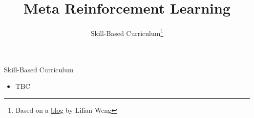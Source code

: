 


\title[Meta-RL]{Meta Reinforcement Learning}
\subtitle{Skill-Based Curriculum\footnote{Based on a \href{https://lilianweng.github.io/lil-log/2020/01/29/curriculum-for-reinforcement-learning.html}{blog} by Lilian Weng}}



	
	\maketitle

\begin{frame}[c]{Skill-Based Curriculum}
	
	\begin{itemize}
		\item TBC
	\end{itemize}
	
\end{frame}



